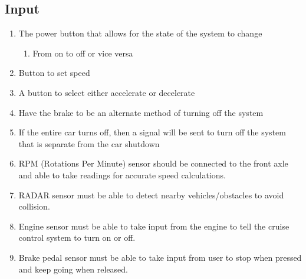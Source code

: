 \documentclass[preprint,11pt,3p]{article}
\begin{document}
\subsection{Input}
\begin{enumerate}
	\item The power button that allows for the state of the system to change
		\begin{enumerate}
			\item From on to off or vice versa
		\end{enumerate}
	\item Button to set speed %
	\item A button to select either accelerate or decelerate
	\item Have the brake to be an alternate method of turning off the system
	\item If the entire car turns off, then a signal will be sent to turn off the system that is separate from the car shutdown
	\item RPM (Rotations Per Minute) sensor should be connected to the front axle and able to take readings for accurate speed calculations. 
	\item RADAR sensor must be able to detect nearby vehicles/obstacles to avoid collision. %
	\item Engine sensor must be able to take input from the engine to tell the cruise control system to turn on or off.
	\item Brake pedal sensor must be able to take input from user to stop when pressed and keep going when released.
\end{enumerate}
\end{document}
